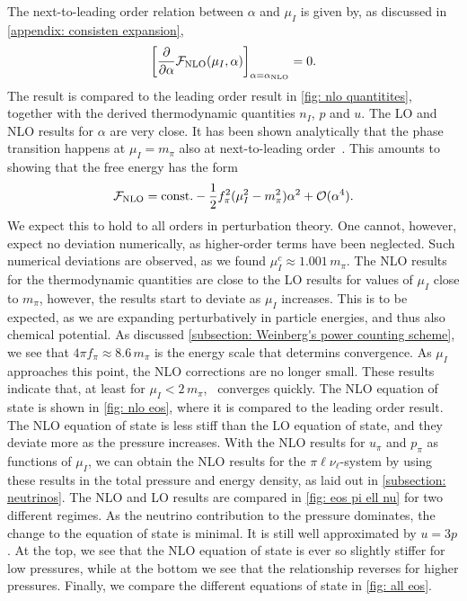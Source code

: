 The next-to-leading order relation between $\alpha$ and $\mu_I$ is given by, as discussed in \autoref{appendix: consisten expansion},
%
\begin{equation}
    \left[\pdv*{\mathcal{F}_\text{NLO}(\mu_I, \alpha)}{\alpha} \right]_{\alpha = \alpha_\text{NLO}} = 0.
\end{equation}
%
The result is compared to the leading order result in \autoref{fig: nlo quantitites}, together with the derived thermodynamic quantities $n_I$, $p$ and $u$.
The LO and NLO results for $\alpha$ are very close.
It has been shown analytically that the phase transition happens at $\mu_I=m_\pi$ also at next-to-leading order~\autocite{adhikariTwoflavorChiralPerturbation2019}.
This amounts to showing that the free energy has the form
%
\begin{equation}
    \mathcal{F}_\text{NLO} = \mathrm{const.} - \frac{1}{2} f_\pi^2 (\mu_I^2 - m_\pi^2)\alpha^2 + \mathcal O(\alpha^4).
\end{equation}
%
We expect this to hold to all orders in perturbation theory.
One cannot, however, expect no deviation numerically, as higher-order terms have been neglected.
Such numerical deviations are observed, as we found $\mu_I^c \approx 1.001\,m_\pi$.
The NLO results for the thermodynamic quantities are close to the LO results for values of $\mu_I$ close to $m_\pi$, however, the results start to deviate as $\mu_I$ increases.
This is to be expected, as we are expanding perturbatively in particle energies, and thus also chemical potential.
As discussed \autoref{subsection: Weinberg's power counting scheme}, we see that $4\pi f_\pi \approx 8.6 \,m_\pi$ is the energy scale that determins convergence.
As $\mu_I$ approaches this point, the NLO corrections are no longer small.
These results indicate that, at least for $\mu_I< 2\,m_\pi$, \chpt\, converges quickly.
The NLO equation of state is shown in \autoref{fig: nlo eos}, where it is compared to the leading order result.
The NLO equation of state is less stiff than the LO equation of state, and they deviate more as the pressure increases.
With the NLO results for $u_\pi$ and $p_\pi$ as functions of $\mu_I$, we can obtain the NLO results for the $\pi\ell\nu_\ell$-system by using these results in the total pressure and energy density, as laid out in \autoref{subsection: neutrinos}.
The NLO and LO results are compared in \autoref{fig: eos pi ell nu} for two different regimes.
As the neutrino contribution to the pressure dominates, the change to the equation of state is minimal.
It is still well approximated by $u = 3p$.
At the top, we see that the NLO equation of state is ever so slightly stiffer for low pressures, while at the bottom we see that the relationship reverses for higher pressures.
Finally, we compare the different equations of state in \autoref{fig: all eos}.

